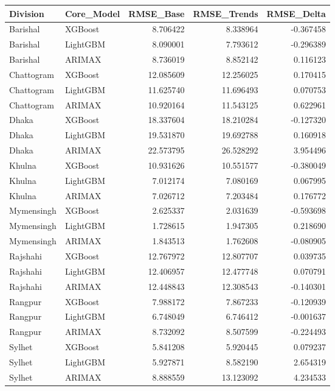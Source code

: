 \begin{tabular}{llrrr}
\toprule
Division & Core_Model & RMSE_Base & RMSE_Trends & RMSE_Delta \\
\midrule
Barishal & XGBoost & 8.706422 & 8.338964 & -0.367458 \\
Barishal & LightGBM & 8.090001 & 7.793612 & -0.296389 \\
Barishal & ARIMAX & 8.736019 & 8.852142 & 0.116123 \\
Chattogram & XGBoost & 12.085609 & 12.256025 & 0.170415 \\
Chattogram & LightGBM & 11.625740 & 11.696493 & 0.070753 \\
Chattogram & ARIMAX & 10.920164 & 11.543125 & 0.622961 \\
Dhaka & XGBoost & 18.337604 & 18.210284 & -0.127320 \\
Dhaka & LightGBM & 19.531870 & 19.692788 & 0.160918 \\
Dhaka & ARIMAX & 22.573795 & 26.528292 & 3.954496 \\
Khulna & XGBoost & 10.931626 & 10.551577 & -0.380049 \\
Khulna & LightGBM & 7.012174 & 7.080169 & 0.067995 \\
Khulna & ARIMAX & 7.026712 & 7.203484 & 0.176772 \\
Mymensingh & XGBoost & 2.625337 & 2.031639 & -0.593698 \\
Mymensingh & LightGBM & 1.728615 & 1.947305 & 0.218690 \\
Mymensingh & ARIMAX & 1.843513 & 1.762608 & -0.080905 \\
Rajshahi & XGBoost & 12.767972 & 12.807707 & 0.039735 \\
Rajshahi & LightGBM & 12.406957 & 12.477748 & 0.070791 \\
Rajshahi & ARIMAX & 12.448843 & 12.308543 & -0.140301 \\
Rangpur & XGBoost & 7.988172 & 7.867233 & -0.120939 \\
Rangpur & LightGBM & 6.748049 & 6.746412 & -0.001637 \\
Rangpur & ARIMAX & 8.732092 & 8.507599 & -0.224493 \\
Sylhet & XGBoost & 5.841208 & 5.920445 & 0.079237 \\
Sylhet & LightGBM & 5.927871 & 8.582190 & 2.654319 \\
Sylhet & ARIMAX & 8.888559 & 13.123092 & 4.234533 \\
\bottomrule
\end{tabular}
